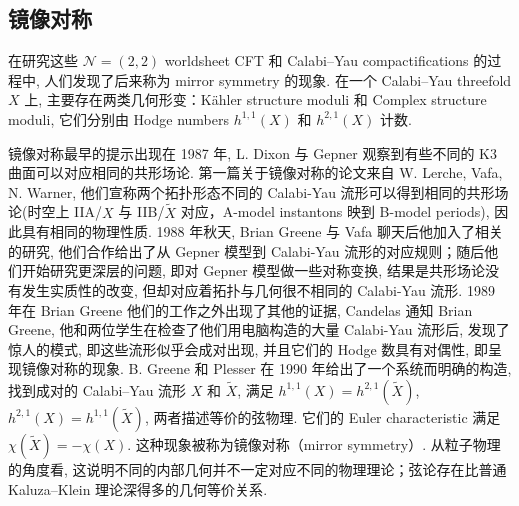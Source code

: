 \documentclass[10pt]{article}
\newcounter{ex}[section]\setcounter{ex}{0}
\numberwithin{equation}{section}
\begin{document}
\subsection{镜像对称}

在研究这些 $\mathcal N=(2,2)$ worldsheet CFT 和 Calabi–Yau compactifications 的过程中, 人们发现了后来称为 mirror symmetry 的现象. 在一个 Calabi–Yau threefold $X$ 上, 主要存在两类几何形变：Kähler structure moduli 和 Complex structure moduli, 它们分别由 Hodge numbers $h^{1,1}(X)$ 和 $h^{2,1}(X)$ 计数. 

镜像对称最早的提示出现在 1987 年, L. Dixon 与 Gepner 观察到有些不同的 K3 曲面可以对应相同的共形场论. 第一篇关于镜像对称的论文来自 W. Lerche, Vafa, N. Warner, 他们宣称两个拓扑形态不同的 Calabi-Yau 流形可以得到相同的共形场论(时空上 IIA/$X$ 与 IIB/$\widetilde X$ 对应，A-model instantons 映到 B-model periods), 因此具有相同的物理性质. 1988 年秋天, Brian Greene 与 Vafa 聊天后他加入了相关的研究, 他们合作给出了从 Gepner 模型到 Calabi-Yau 流形的对应规则；随后他们开始研究更深层的问题, 即对 Gepner 模型做一些对称变换, 结果是共形场论没有发生实质性的改变, 但却对应着拓扑与几何很不相同的 Calabi-Yau 流形. 1989 年在 Brian Greene 他们的工作之外出现了其他的证据, Candelas 通知 Brian Greene, 他和两位学生在检查了他们用电脑构造的大量 Calabi-Yau 流形后, 发现了惊人的模式, 即这些流形似乎会成对出现, 并且它们的 Hodge 数具有对偶性, 即呈现镜像对称的现象.  B. Greene 和 Plesser 在 1990 年给出了一个系统而明确的构造, 找到成对的 Calabi–Yau 流形 $X$ 和 $\widetilde X$, 满足 $h^{1,1}(X)=h^{2,1}(\widetilde X)$, $h^{2,1}(X)=h^{1,1}(\widetilde X)$, 两者描述等价的弦物理. 它们的 Euler characteristic 满足 $\chi(\widetilde X)=-\chi(X)$. 这种现象被称为镜像对称（mirror symmetry）. 从粒子物理的角度看, 这说明不同的内部几何并不一定对应不同的物理理论；弦论存在比普通 Kaluza–Klein 理论深得多的几何等价关系\cite{LercheVafaWarner1989,GreeneVafaWarner1989,CandelasLynkerSchimmrigk1990,GreenePlesser1990}. 
\end{document}
